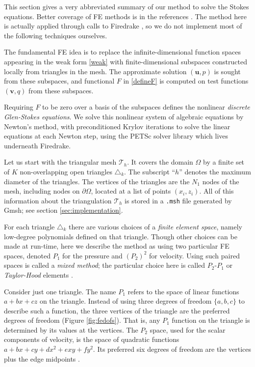 \documentclass[letterpaper,final,12pt,reqno]{amsart}
\newcommand{\bu}{\mathbf{u}}
\newcommand{\bv}{\mathbf{v}}
\begin{document}
This section gives a very abbreviated summary of our method to solve the Stokes equations.  Better coverage of FE methods is in the references \cite{Braess2007,Bueler2021,Elmanetal2014}.  The method here is actually applied through calls to Firedrake \cite{Rathgeberetal2016}, so we do not implement most of the following techniques ourselves.

The fundamental FE idea is to replace the infinite-dimensional function spaces appearing in the weak form \eqref{weak} with finite-dimensional subspaces constructed locally from triangles in the mesh.  The approximate solution $(\bu,p)$ is sought from these subspaces, and functional $F$ in \eqref{defineF} is computed on test functions $(\bv,q)$ from these subspaces.

Requiring $F$ to be zero over a basis of the subspaces defines the nonlinear \emph{discrete Glen-Stokes equations}.  We solve this nonlinear system of algebraic equations by Newton's method, with preconditioned Krylov iterations to solve the linear equations at each Newton step, using the PETSc solver library \cite{Balayetal2018,Bueler2021} which lives underneath Firedrake.

Let us start with the triangular mesh $\mathcal{T}_h$.  It covers the domain $\Omega$ by a finite set of $K$ non-overlapping open triangles $\triangle_k$.  The subscript ``$h$'' denotes the maximum diameter of the triangles.  The vertices of the triangles are the $N_1$ nodes of the mesh, including nodes on $\partial\Omega$, located at a list of points $(x_i,z_i)$.  All of this information about the triangulation $\mathcal{T}_h$ is stored in a \texttt{.msh} file generated by Gmsh; see section \ref{sec:implementation}.

For each triangle $\triangle_k$ there are various choices of a \emph{finite element space}, namely low-degree polynomials defined on that triangle.  Though other choices can be made at run-time, here we describe the method as using two particular FE spaces, denoted $P_1$ for the pressure and $(P_2)^2$ for velocity.  Using such paired spaces is called a \emph{mixed method}; the particular choice here is called $P_2$-$P_1$ or \emph{Taylor-Hood} elements \cite{Elmanetal2014}.

Consider just one triangle.  The name $P_1$ refers to the space of linear functions $a + b x + c z$ on the triangle.  Instead of using three degrees of freedom $\{a,b,c\}$ to describe such a function, the three vertices of the triangle are the preferred degrees of freedom (Figure \ref{fig:fedofs}).  That is, any $P_1$ function on the triangle is determined by its values at the vertices.  The $P_2$ space, used for the scalar components of velocity, is the space of quadratic functions $a + bx + cy + dx^2 + exy + fy^2$.  Its preferred six degrees of freedom are the vertices plus the edge midpoints \cite{Elmanetal2014}.
\end{document}
